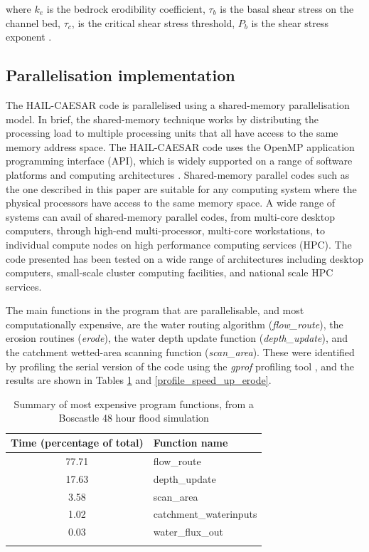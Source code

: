 where \(k_e\) is the bedrock erodibility coefficient, \(\tau_b\) is the basal shear stress on the channel bed, \(\tau_c\), is the critical shear stress threshold, \(P_b\) is the shear stress exponent \citep{Howard1983,whipple1999dynamics}.

\subsection{Parallelisation implementation}
The HAIL-CAESAR code is parallelised using a shared-memory parallelisation model. In brief, the shared-memory technique works by distributing the processing load to multiple processing units that all have access to the same memory address space. The HAIL-CAESAR code uses the OpenMP application programming interface (API), which is widely supported on a range of software platforms and computing architectures \citep{dagum1998openmp}. Shared-memory parallel codes such as the one described in this paper are suitable for any computing system where the physical processors have access to the same memory space. A wide range of systems can avail of shared-memory parallel codes, from multi-core desktop computers, through high-end multi-processor, multi-core workstations, to individual compute nodes on high performance computing services (HPC). The code presented has been tested on a wide range of architectures including desktop computers,  small-scale cluster computing facilities, and national scale HPC services.

The main functions in the program that are parallelisable, and most computationally expensive, are the water routing algorithm (\textit{flow\_route}), the erosion routines (\textit{erode}), the water depth update function (\textit{depth\_update}), and the catchment wetted-area scanning function (\textit{scan\_area}). These were identified by profiling the serial version of the code using the \textit{gprof} profiling tool \citep{graham1982gprof}, and the results are shown in Tables \ref{profile_speed_up_hydro} and \ref{profile_speed_up_erode}.

\begin{table}
\caption{Summary of most expensive program functions, from a Boscastle 48 hour flood simulation}
\begin{tabular}{cl}

\textbf{Time} (percentage of total) & \textbf{Function name} \\
\hline
77.71                                     & flow\_route \\
17.63                                     & depth\_update \\
3.58                                       & scan\_area \\
1.02                                       & catchment\_waterinputs \\
0.03                                       & water\_flux\_out \\
\hline \\
\end{tabular} 
\label{profile_speed_up_hydro}
\end{table}

